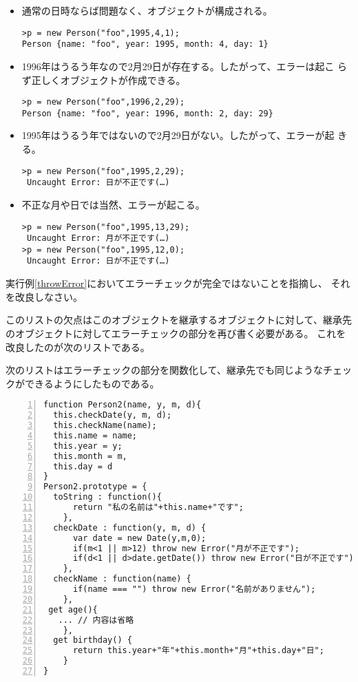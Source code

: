 \begin{itemize}
 \item 通常の日時ならば問題なく、オブジェクトが構成される。
\begin{Verbatim}
>p = new Person("foo",1995,4,1);
Person {name: "foo", year: 1995, month: 4, day: 1}
\end{Verbatim}
 \item 1996年はうるう年なので2月29日が存在する。したがって、エラーは起こ
			 らず正しくオブジェクトが作成できる。
\begin{Verbatim}
>p = new Person("foo",1996,2,29);
Person {name: "foo", year: 1996, month: 2, day: 29}
\end{Verbatim}
 \item 1995年はうるう年ではないので2月29日がない。したがって、エラーが起
			 きる。
\begin{Verbatim}
>p = new Person("foo",1995,2,29);
 Uncaught Error: 日が不正です(…)
\end{Verbatim}
 \item 不正な月や日では当然、エラーが起こる。
\begin{Verbatim}
>p = new Person("foo",1995,13,29);
 Uncaught Error: 月が不正です(…)
>p = new Person("foo",1995,12,0);
 Uncaught Error: 日が不正です(…)
\end{Verbatim}
\end{itemize}
\begin{Prob}\upshape\label{CorrectErrorCheck}
 実行例\ref{throwError}においてエラーチェックが完全ではないことを指摘し、
 それを改良しなさい。
\end{Prob}
このリストの欠点はこのオブジェクトを継承するオブジェクトに対して、継承先
のオブジェクトに対してエラーチェックの部分を再び書く必要がある。
これを改良したのが次のリストである。
\begin{Exec}\upshape\label{Error2}
次のリストはエラーチェックの部分を関数化して、継承先でも同じようなチェッ
 クができるようにしたものである。
\begin{Verbatim}[numbers=left]
function Person2(name, y, m, d){
  this.checkDate(y, m, d);
  this.checkName(name);
  this.name = name;
  this.year = y;
  this.month = m,
  this.day = d
}
Person2.prototype = {
  toString : function(){
      return "私の名前は"+this.name+"です";
    },
  checkDate : function(y, m, d) {
      var date = new Date(y,m,0);
      if(m<1 || m>12) throw new Error("月が不正です");
      if(d<1 || d>date.getDate()) throw new Error("日が不正です");
    },
  checkName : function(name) {
      if(name === "") throw new Error("名前がありません");
    },
 get age(){
   ... // 内容は省略
    },
  get birthday() {
      return this.year+"年"+this.month+"月"+this.day+"日";
    }
}
\end{Verbatim}
 \end{Exec}
